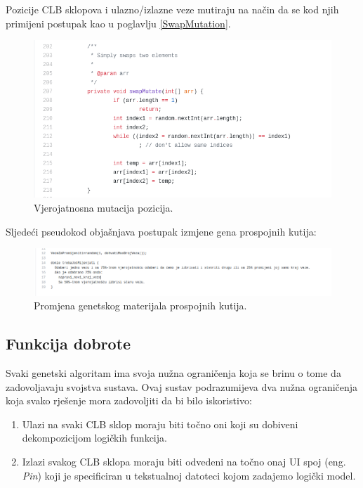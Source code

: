 \documentclass[times, utf8, zavrsni]{fer}
\begin{document}
	Pozicije CLB sklopova i ulazno/izlazne veze mutiraju na način da se kod njih primijeni postupak kao u poglavlju \ref{SwapMutation}.
	
	\begin{figure}[H]
		\centering
		\includegraphics[width=18cm]{slike/swapMutate.png}
		\caption{Vjerojatnosna mutacija pozicija. }
		\label{fig:sw-boxes-mutation}
	\end{figure} 
	
	Sljedeći pseudokod objašnjava postupak izmjene gena prospojnih kutija: 
	
	\begin{figure}[H]
		\centering
		\includegraphics[width=18cm]{slike/pseudokod.png}
		\caption{Promjena genetskog materijala prospojnih kutija.}
		\label{fig:pseudokod-prospojne}
	\end{figure} 
	
	\subsection{Funkcija dobrote}
	
	Svaki genetski algoritam ima svoja nužna ograničenja koja se brinu o tome da zadovoljavaju svojstva sustava. Ovaj sustav podrazumijeva dva nužna ograničenja koja svako rješenje mora zadovoljiti da bi bilo iskoristivo:
	
	\begin{enumerate}
		\item Ulazi na svaki CLB sklop moraju biti točno oni koji su dobiveni dekompozicijom logičkih funkcija.
		\item Izlazi svakog CLB sklopa moraju biti odvedeni na točno onaj UI spoj (eng. \emph{Pin}) koji je specificiran u tekstualnoj datoteci kojom zadajemo logički model.
	\end{enumerate}
	
\end{document}
